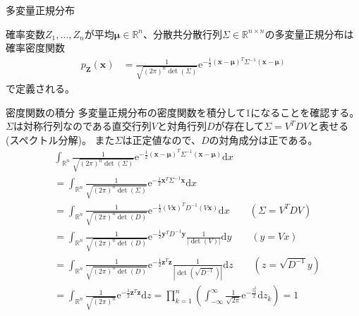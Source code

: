 \documentclass[lualatex,handout]{beamer}
\theoremstyle{definition}
\begin{document}
\begin{frame}{多変量正規分布}
\begin{definition}[多変量正規分布]
確率変数$Z_1,\dotsc,Z_n$が平均$\symbf{\mu}\in\mathbb{R}^n$、分散共分散行列$\Sigma\in\mathbb{R}^{n\times n}$の多変量正規分布は確率密度関数
\begin{align*}
p_{\symbf{Z}}(\symbf{x}) &= \frac1{\sqrt{(2\pi)^n\det(\Sigma)}} \mathrm{e}^{-\frac12 (\symbf{x}-\symbf{\mu})^T\Sigma^{-1} (\symbf{x}-\symbf{\mu})}
\end{align*}
で定義される。
\end{definition}
\end{frame}

\begin{frame}{密度関数の積分}
\small
多変量正規分布の密度関数を積分して1になることを確認する。
$\Sigma$は対称行列なのである直交行列$V$と対角行列$D$が存在して$\Sigma=V^TDV$と表せる(スペクトル分解)。
また$\Sigma$は正定値なので、$D$の対角成分は正である。
\begin{align*}
&\int_{\mathbb{R}^n} \frac1{\sqrt{(2\pi)^n\det(\Sigma)}} \mathrm{e}^{-\frac12 (\symbf{x}-\symbf{\mu})^T\Sigma^{-1} (\symbf{x}-\symbf{\mu})}\mathrm{d}x\\
&=
\int_{\mathbb{R}^n} \frac1{\sqrt{(2\pi)^n\det(\Sigma)}} \mathrm{e}^{-\frac12 \symbf{x}^T\Sigma^{-1} \symbf{x}}\mathrm{d}x\\
&=
\int_{\mathbb{R}^n} \frac1{\sqrt{(2\pi)^n\det(D)}} \mathrm{e}^{-\frac12 (V\symbf{x})^TD^{-1} (V\symbf{x})}\mathrm{d}x\qquad(\Sigma=V^TDV)\\
&=
\int_{\mathbb{R}^n} \frac1{\sqrt{(2\pi)^n\det(D)}} \mathrm{e}^{-\frac12 \symbf{y}^TD^{-1} \symbf{y}}\frac1{|\det(V)|}\mathrm{d}y\qquad (y=Vx)\\
&=
\int_{\mathbb{R}^n} \frac1{\sqrt{(2\pi)^n\det(D)}} \mathrm{e}^{-\frac12 \symbf{z}^T \symbf{z}}\frac1{|\det(\sqrt{D^{-1}})|}\mathrm{d}z\qquad (z=\sqrt{D^{-1}}y)\\
&=
\int_{\mathbb{R}^n} \frac1{\sqrt{(2\pi)^n}} \mathrm{e}^{-\frac12 \symbf{z}^T \symbf{z}}\mathrm{d}z
=\prod_{k=1}^n\left(\int_{-\infty}^\infty \frac1{\sqrt{2\pi}}\mathrm{e}^{-\frac{z_k^2}2}\mathrm{d}z_k\right) = 1
\end{align*}
\end{frame}
\end{document}
